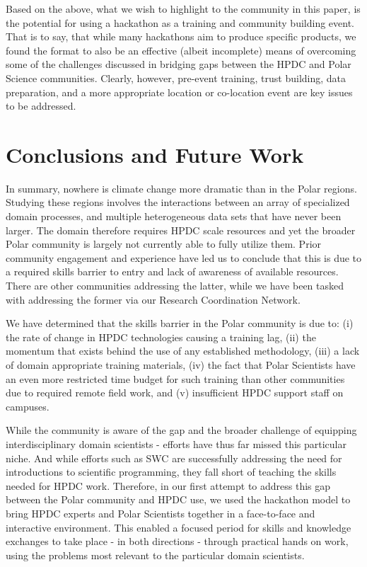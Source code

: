 \documentclass[conference]{IEEEtran}
\begin{document}
Based on the above, what we wish to highlight to the community in this paper, is the potential for using a hackathon as a training and community building event. That is to say, that while many hackathons aim to produce specific products, we found the format to also be an effective (albeit incomplete) means of overcoming some of the challenges discussed in bridging gaps between the HPDC and Polar Science communities. Clearly, however, pre-event training, trust building, data preparation, and a more appropriate location or co-location event are key issues to be addressed. 

\section{Conclusions and Future Work}
In summary, nowhere is climate change more dramatic than in the Polar regions. Studying these regions involves the interactions between an array of specialized domain processes, and multiple heterogeneous data sets that have never been larger. The domain therefore requires HPDC scale resources and yet the broader Polar community is largely not currently able to fully utilize them. Prior community engagement and experience have led us to conclude that this is due to a required skills barrier to entry and lack of awareness of available resources. There are other communities addressing the latter, while we have been tasked with addressing the former via our Research Coordination Network.

We have determined that the skills barrier in the Polar community is due to: (i) the rate of change in HPDC technologies causing a training lag, (ii) the momentum that exists behind the use of any established methodology, (iii) a lack of domain appropriate training materials, (iv) the fact that Polar Scientists have an even more restricted time budget for such training than other communities due to required remote field work, and (v) insufficient HPDC support staff on campuses.

While the community is aware of the gap and the broader challenge of equipping interdisciplinary domain scientists - efforts have thus far missed this particular niche.  And while efforts such as SWC are successfully addressing the need for introductions to scientific programming, they fall short of teaching the skills needed for HPDC work. Therefore, in our first attempt to address this gap between the Polar community and HPDC use, we used the hackathon model to bring HPDC experts and Polar Scientists together in a face-to-face and interactive environment.  This enabled a focused period for skills and knowledge exchanges to take place - in both directions - through practical hands on work, using the problems most relevant to the particular domain scientists.  
\end{document}
